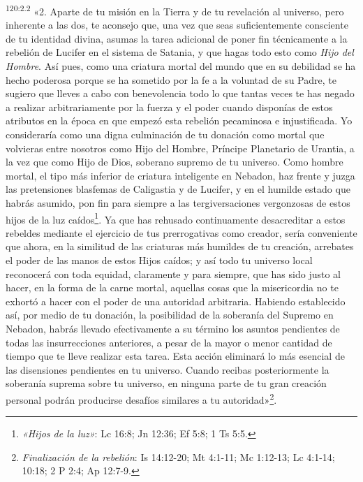 \par
\textsuperscript{120:2.2} «2. Aparte de tu misión en la Tierra y de tu revelación al universo, pero inherente a las dos, te aconsejo que, una vez que seas suficientemente consciente de tu identidad divina, asumas la tarea adicional de poner fin técnicamente a la rebelión de Lucifer en el sistema de Satania, y que hagas todo esto como \textit{Hijo del Hombre}. Así pues, como una criatura mortal del mundo que en su debilidad se ha hecho poderosa porque se ha sometido por la fe a la voluntad de su Padre, te sugiero que lleves a cabo con benevolencia todo lo que tantas veces te has negado a realizar arbitrariamente por la fuerza y el poder cuando disponías de estos atributos en la época en que empezó esta rebelión pecaminosa e injustificada. Yo consideraría como una digna culminación de tu donación como mortal que volvieras entre nosotros como Hijo del Hombre, Príncipe Planetario de Urantia, a la vez que como Hijo de Dios, soberano supremo de tu universo. Como hombre mortal, el tipo más inferior de criatura inteligente en Nebadon, haz frente y juzga las pretensiones blasfemas de Caligastia y de Lucifer, y en el humilde estado que habrás asumido, pon fin para siempre a las tergiversaciones vergonzosas de estos hijos de la luz caídos\footnote{\textit{«Hijos de la luz»}: Lc 16:8; Jn 12:36; Ef 5:8; 1 Ts 5:5.}. Ya que has rehusado continuamente desacreditar a estos rebeldes mediante el ejercicio de tus prerrogativas como creador, sería conveniente que ahora, en la similitud de las criaturas más humildes de tu creación, arrebates el poder de las manos de estos Hijos caídos; y así todo tu universo local reconocerá con toda equidad, claramente y para siempre, que has sido justo al hacer, en la forma de la carne mortal, aquellas cosas que la misericordia no te exhortó a hacer con el poder de una autoridad arbitraria. Habiendo establecido así, por medio de tu donación, la posibilidad de la soberanía del Supremo en Nebadon, habrás llevado efectivamente a su término los asuntos pendientes de todas las insurrecciones anteriores, a pesar de la mayor o menor cantidad de tiempo que te lleve realizar esta tarea. Esta acción eliminará lo más esencial de las disensiones pendientes en tu universo. Cuando recibas posteriormente la soberanía suprema sobre tu universo, en ninguna parte de tu gran creación personal podrán producirse desafíos similares a tu autoridad»\footnote{\textit{Finalización de la rebelión}: Is 14:12-20; Mt 4:1-11; Mc 1:12-13; Lc 4:1-14; 10:18; 2 P 2:4; Ap 12:7-9.}.


